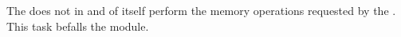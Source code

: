 The \mmuMod{} does not in and of itself perform the memory operations requested by the \hubMod{}.
This task befalls the \mmioMod{} module.
